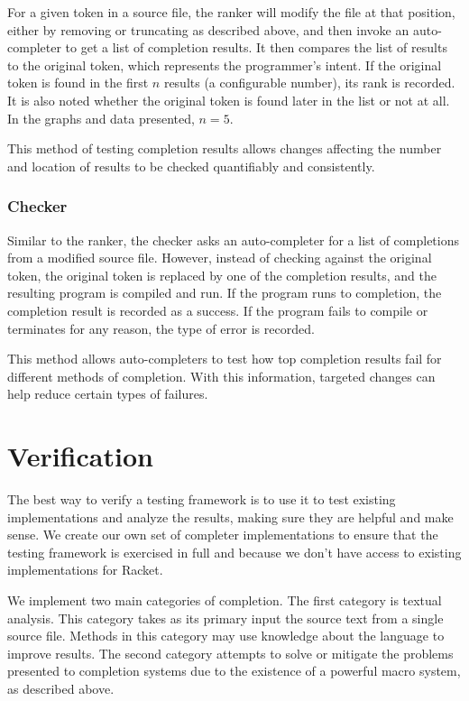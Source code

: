 \documentclass[ms,electronic,twosidetoc,letterpaper,chaptercenter,parttop,lol,lof,lot]{byumsphd}
\begin{document}
For a given token in a source file, the ranker will modify the file at that position, either by removing or truncating as described above, and then invoke an auto-completer to get a list of completion results.
It then compares the list of results to the original token, which represents the programmer's intent.
If the original token is found in the first $n$ results (a configurable number), its rank is recorded.
It is also noted whether the original token is found later in the list or not at all.
In the graphs and data presented, $n = 5$.

This method of testing completion results allows changes affecting the number and location of results to be checked quantifiably and consistently.

\subsection*{Checker}

Similar to the ranker, the checker asks an auto-completer for a list of completions from a modified source file.
However, instead of checking against the original token, the original token is replaced by one of the completion results, and the resulting program is compiled and run.
If the program runs to completion, the completion result is recorded as a success.
If the program fails to compile or terminates for any reason, the type of error is recorded.

This method allows auto-completers to test how top completion results fail for different methods of completion.
With this information, targeted changes can help reduce certain types of failures.

\chapter{Verification}

The best way to verify a testing framework is to use it to test existing implementations and analyze the results, making sure they are helpful and make sense.
We create our own set of completer implementations to ensure that the testing framework is exercised in full and because we don't have access to existing implementations for Racket.

We implement two main categories of completion.
The first category is textual analysis.
This category takes as its primary input the source text from a single source file.
Methods in this category may use knowledge about the language to improve results.
The second category attempts to solve or mitigate the problems presented to completion systems due to the existence of a powerful macro system, as described above.
\end{document}
